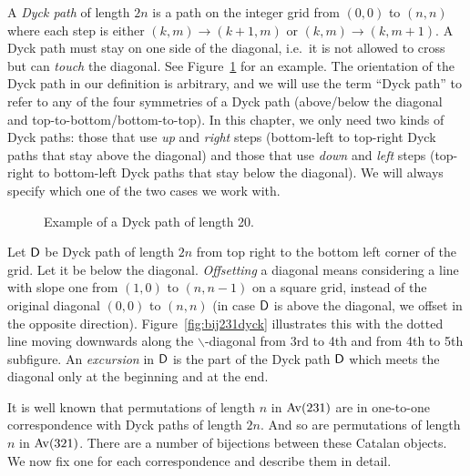 \documentclass[12pt, a4paper, twoside]{report}
\begin{document}
A \emph{Dyck path} of length $2n$ is a path on the integer grid from $(0,0)$ to $(n,n)$ where each step is either $(k,m) \to (k+1,m)$ or $(k,m) \to (k,m+1)$. A Dyck path must stay on one side of the diagonal, i.e.~it is not allowed to cross but can \emph{touch} the diagonal. See Figure~\ref{fig:dyckexample} for an example. The orientation of the Dyck path in our definition is arbitrary, and we will use the term ``Dyck path'' to refer to any of the four symmetries of a Dyck path (above/below the diagonal and top-to-bottom/bottom-to-top). In this chapter, we only need two kinds of Dyck paths: those that use \emph{up} and \emph{right} steps (bottom-left to top-right Dyck paths that stay above the diagonal) and those that use \emph{down} and \emph{left} steps (top-right to bottom-left Dyck paths that stay below the diagonal). We will always specify which one of the two cases we work with.\\
\begin{figure}[!ht]
\begin{center}
\end{center}
\caption{\small Example of a Dyck path of length 20.}
\label{fig:dyckexample}
\end{figure}

Let $\textsf{D}$ be Dyck path of length $2n$ from top right to the bottom left corner of the grid. Let it be below the diagonal. \emph{Offsetting} a diagonal means considering a line with slope one from $(1,0)$ to $(n,n-1)$ on a square grid, instead of the original diagonal $(0,0)$ to $(n,n)$ (in case $\textsf{D}$ is above the diagonal, we offset in the opposite direction). Figure~\ref{fig:bij231dyck} illustrates this with the dotted line moving downwards along the $\backslash$-diagonal from 3rd to 4th and from 4th to 5th subfigure. An \emph{excursion} in $\textsf{D}$ is the part of the Dyck path $\textsf{D}$ which meets the diagonal only at the beginning and at the end.

It is well known that permutations of length $n$ in $\mathrm{Av}(231)$ are in one-to-one correspondence with Dyck paths of length $2n$. And so are permutations of length $n$ in $\mathrm{Av}(321)$. There are a number of bijections between these Catalan objects. We now fix one for each correspondence and describe them in detail.
\end{document}
